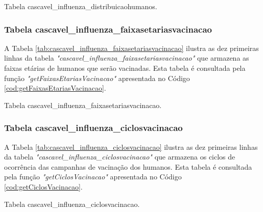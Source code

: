 \begin{table}[H]
\centering
{}
\caption{Tabela cascavel\_influenza\_distribuicaohumanos.}
\label{tab:cascavel_influenza_distribuicaohumanos}
\end{table}

\subsubsection{Tabela cascavel\_influenza\_faixasetariasvacinacao}

A Tabela \ref{tab:cascavel_influenza_faixasetariasvacinacao} ilustra as dez primeiras linhas da tabela \textit{"cascavel\_influenza\_faixasetariasvacinacao"} que armazena as faixas etárias de humanos que serão vacinadas. Esta tabela é consultada pela função \textit{"getFaixasEtariasVacinacao"} apresentada no Código \ref{cod:getFaixasEtariasVacinacao}. 

\begin{table}[H]
\centering
{}
\caption{Tabela cascavel\_influenza\_faixasetariasvacinacao.}
\label{tab:cascavel_influenza_faixasetariasvacinacao}
\end{table}

\subsubsection{Tabela cascavel\_influenza\_ciclosvacinacao}

A Tabela \ref{tab:cascavel_influenza_ciclosvacinacao} ilustra as dez primeiras linhas da tabela \textit{"cascavel\_influenza\_ciclosvacinacao"} que armazena os ciclos de ocorrência das campanhas de vacinação dos humanos. Esta tabela é consultada pela função \textit{"getCiclosVacinacao"} apresentada no Código \ref{cod:getCiclosVacinacao}. 

\begin{table}[H]
\centering
{}
\caption{Tabela cascavel\_influenza\_ciclosvacinacao.}
\label{tab:cascavel_influenza_ciclosvacinacao}
\end{table}

